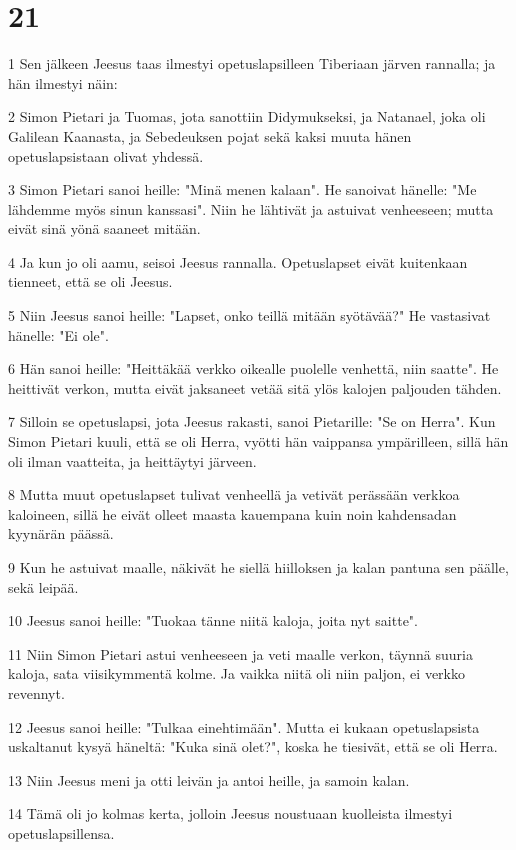 \chapter{21}

\par 1 Sen jälkeen Jeesus taas ilmestyi opetuslapsilleen Tiberiaan järven rannalla; ja hän ilmestyi näin:
\par 2 Simon Pietari ja Tuomas, jota sanottiin Didymukseksi, ja Natanael, joka oli Galilean Kaanasta, ja Sebedeuksen pojat sekä kaksi muuta hänen opetuslapsistaan olivat yhdessä.
\par 3 Simon Pietari sanoi heille: "Minä menen kalaan". He sanoivat hänelle: "Me lähdemme myös sinun kanssasi". Niin he lähtivät ja astuivat venheeseen; mutta eivät sinä yönä saaneet mitään.
\par 4 Ja kun jo oli aamu, seisoi Jeesus rannalla. Opetuslapset eivät kuitenkaan tienneet, että se oli Jeesus.
\par 5 Niin Jeesus sanoi heille: "Lapset, onko teillä mitään syötävää?" He vastasivat hänelle: "Ei ole".
\par 6 Hän sanoi heille: "Heittäkää verkko oikealle puolelle venhettä, niin saatte". He heittivät verkon, mutta eivät jaksaneet vetää sitä ylös kalojen paljouden tähden.
\par 7 Silloin se opetuslapsi, jota Jeesus rakasti, sanoi Pietarille: "Se on Herra". Kun Simon Pietari kuuli, että se oli Herra, vyötti hän vaippansa ympärilleen, sillä hän oli ilman vaatteita, ja heittäytyi järveen.
\par 8 Mutta muut opetuslapset tulivat venheellä ja vetivät perässään verkkoa kaloineen, sillä he eivät olleet maasta kauempana kuin noin kahdensadan kyynärän päässä.
\par 9 Kun he astuivat maalle, näkivät he siellä hiilloksen ja kalan pantuna sen päälle, sekä leipää.
\par 10 Jeesus sanoi heille: "Tuokaa tänne niitä kaloja, joita nyt saitte".
\par 11 Niin Simon Pietari astui venheeseen ja veti maalle verkon, täynnä suuria kaloja, sata viisikymmentä kolme. Ja vaikka niitä oli niin paljon, ei verkko revennyt.
\par 12 Jeesus sanoi heille: "Tulkaa einehtimään". Mutta ei kukaan opetuslapsista uskaltanut kysyä häneltä: "Kuka sinä olet?", koska he tiesivät, että se oli Herra.
\par 13 Niin Jeesus meni ja otti leivän ja antoi heille, ja samoin kalan.
\par 14 Tämä oli jo kolmas kerta, jolloin Jeesus noustuaan kuolleista ilmestyi opetuslapsillensa.
